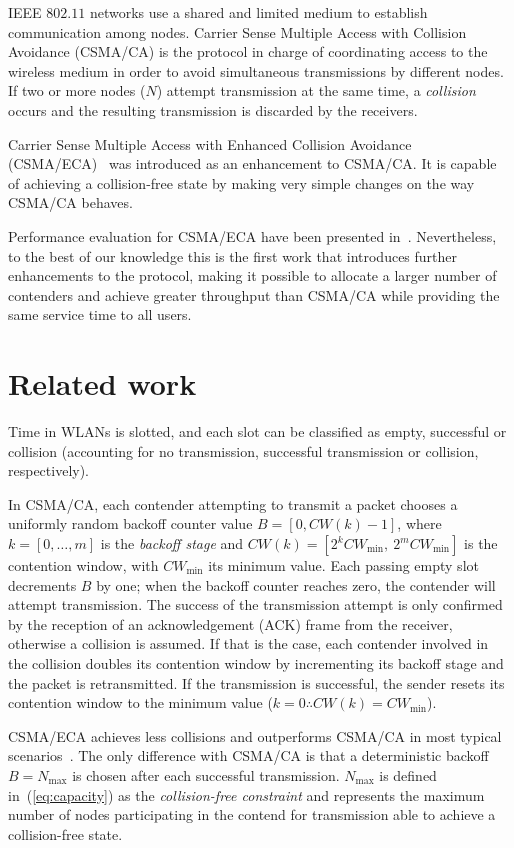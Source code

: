 IEEE $802.11$ networks use a shared and limited medium to establish communication among nodes. Carrier Sense Multiple Access with Collision Avoidance (CSMA/CA) is the protocol in charge of coordinating access to the wireless medium in order to avoid simultaneous transmissions by different nodes. If two or more nodes ($N$) attempt transmission at the same time, a \emph{collision} occurs and the resulting transmission is discarded by the receivers.

Carrier Sense Multiple Access with Enhanced Collision Avoidance (CSMA/ECA)~\cite{CSMA_ECA} was introduced as an enhancement to CSMA/CA. It is capable of achieving a collision-free state by making very simple changes on the way CSMA/CA behaves.

Performance evaluation for CSMA/ECA have been presented in~\cite{E2CA_performance}. Nevertheless, to the best of our knowledge this is the first work that introduces further enhancements to the protocol, making it possible to allocate a larger number of contenders and achieve greater throughput than CSMA/CA while providing the same service time to all users.

\section{Related work}

Time in WLANs is slotted, and each slot can be classified as empty, successful or collision (accounting for no transmission, successful transmission or collision, respectively).

In CSMA/CA, each contender attempting to transmit a packet chooses a uniformly random backoff counter value $B = [0,CW(k)-1]$, where $k=[0,\ldots,m]$ is the \emph{backoff stage} and $CW(k)=[2^{k}CW_{\min},~2^{m}CW_{\min}]$ is the contention window, with $CW_{\min}$ its minimum value. Each passing empty slot decrements $B$ by one; when the backoff counter reaches zero, the contender will attempt transmission. The success of the transmission attempt is only confirmed by the reception of an acknowledgement (ACK) frame from the receiver, otherwise a collision is assumed. If that is the case, each contender involved in the collision doubles its contention window by incrementing its backoff stage and the packet is retransmitted. If the transmission is successful, the sender resets its contention window to the minimum value ($k=0\therefore CW(k)=CW_{\min}$).

CSMA/ECA achieves less collisions and outperforms CSMA/CA in most typical scenarios~\cite{CSMA_ECA}. The only difference with CSMA/CA is that a deterministic backoff~$B=N_{\max}$ is chosen after each successful transmission. $N_{\max}$ is defined in~(\ref{eq:capacity}) as the \emph{collision-free constraint} and represents the maximum number of nodes participating in the contend for transmission able to achieve a collision-free state.

